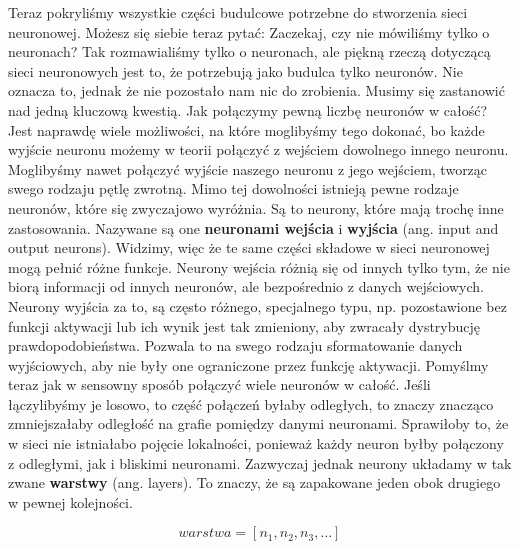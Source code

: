Teraz pokryliśmy wszystkie części budulcowe potrzebne do stworzenia sieci neuronowej. Możesz się siebie teraz pytać: Zaczekaj, czy nie mówiliśmy tylko o neuronach? Tak rozmawialiśmy tylko o neuronach, ale piękną rzeczą dotyczącą sieci neuronowych jest to, że potrzebują jako budulca tylko neuronów. Nie oznacza to, jednak że nie pozostało nam nic do zrobienia. Musimy się zastanowić nad jedną kluczową kwestią. Jak połączymy pewną liczbę neuronów w całość? Jest naprawdę wiele możliwości, na które moglibyśmy tego dokonać, bo każde wyjście neuronu możemy w teorii połączyć z wejściem dowolnego innego neuronu. Moglibyśmy nawet połączyć wyjście naszego neuronu z jego wejściem, tworząc swego rodzaju pętlę zwrotną. Mimo tej dowolności istnieją pewne rodzaje neuronów, które się zwyczajowo wyróżnia. Są to neurony, które mają trochę inne zastosowania. Nazywane są one \textbf{neuronami wejścia} i \textbf{wyjścia} (ang. input and output neurons). Widzimy, więc że te same części składowe w sieci neuronowej mogą pełnić różne funkcje. Neurony wejścia różnią się od innych tylko tym, że nie biorą informacji od innych neuronów, ale bezpośrednio z danych wejściowych. Neurony wyjścia za to, są często różnego, specjalnego typu, np. pozostawione bez funkcji aktywacji lub ich wynik jest tak zmieniony, aby zwracały dystrybucję prawdopodobieństwa. Pozwala to na swego rodzaju sformatowanie danych wyjściowych, aby nie były one ograniczone przez funkcję aktywacji. Pomyślmy teraz jak w sensowny sposób połączyć wiele neuronów w całość. Jeśli łączylibyśmy je losowo, to część połączeń byłaby odległych, to znaczy znacząco zmniejszałaby odległość na grafie pomiędzy danymi neuronami. Sprawiłoby to, że w sieci nie istniałabo pojęcie lokalności, ponieważ każdy neuron byłby połączony z odległymi, jak i bliskimi neuronami. Zazwyczaj jednak neurony układamy w tak zwane \textbf{warstwy} (ang. layers). To znaczy, że są zapakowane jeden obok drugiego w pewnej kolejności.

\begin{equation}
 warstwa = [n_1, n_2, n_3, …]
\end{equation}

